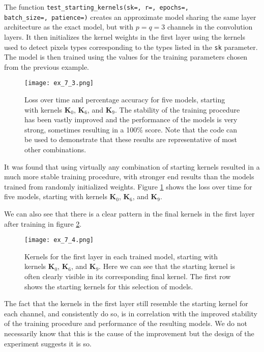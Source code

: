 \documentclass{somasmsc}
\begin{document}
\begin{exa}
The function \verb|test_starting_kernels(sk=, r=, epochs=,| \\ \verb|batch_size=, patience=)| creates an approximate model sharing the same layer architecture as the exact model, but with $p=q=3$ channels in the convolution layers. It then initializes the kernel weights in the first layer using the kernels used to detect pixels types corresponding to the types listed in the \verb|sk| parameter. The model is then trained using the values for the training parameters chosen from the previous example.

\begin{figure}[H]\label{digit:ex_7_3}
\begin{center}
\texttt{[image: ex\_7\_3.png]}
\end{center}
\caption{Loss over time and percentage accuracy for five models, starting with kernels $\mathbf{K}_0$, $\mathbf{K}_6$, and $\mathbf{K}_9$. The stability of the training procedure has been vastly improved and the performance of the models is very strong, sometimes resulting in a 100\% score. Note that the code can be used to demonstrate that these results are representative of most other combinations.}
\end{figure}

It was found that using virtually any combination of starting kernels resulted in a much more stable training procedure, with stronger end results than the models trained from randomly initialized weights. Figure \ref{digit:ex_7_3} shows the loss over time for five models, starting with kernels $\mathbf{K}_0$, $\mathbf{K}_6$, and $\mathbf{K}_9$.

We can also see that there is a clear pattern in the final kernels in the first layer after training in figure \ref{digit:ex_7_4}.

\begin{figure}[H]\label{digit:ex_7_4}
\begin{center}
\texttt{[image: ex\_7\_4.png]}
\end{center}
\caption{Kernels for the first layer in each trained model, starting with kernels $\mathbf{K}_0$, $\mathbf{K}_6$, and $\mathbf{K}_9$. Here we can see that the starting kernel is often clearly visible in its corresponding final kernel. The first row shows the starting kernels for this selection of models.}
\end{figure}

The fact that the kernels in the first layer still resemble the starting kernel for each channel, and consistently do so, is in correlation with the improved stability of the training procedure and performance of the resulting models. We do not necessarily know that this is the cause of the improvement but the design of the experiment suggests it is so.
\end{exa}
\end{document}
